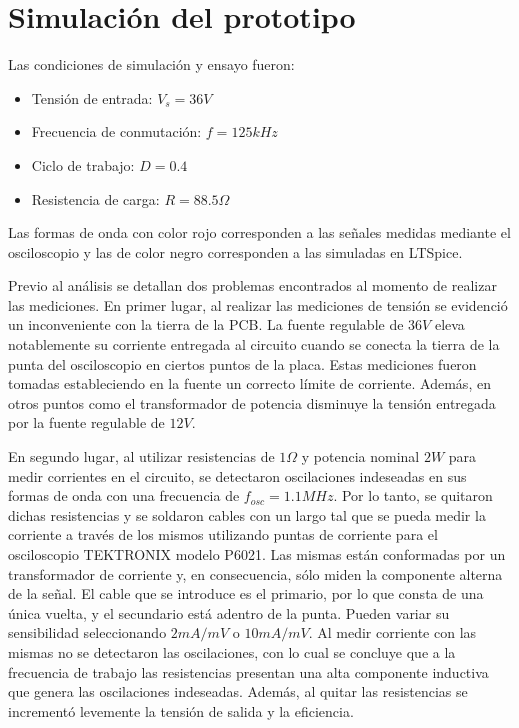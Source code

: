 \section{Simulación del prototipo}

Las condiciones de simulación y ensayo fueron:

\begin{itemize}
    \item Tensión de entrada: $V_s=36V$
    \item Frecuencia de conmutación: $f=125kHz$
    \item Ciclo de trabajo: $D=0.4$
    \item Resistencia de carga: $R=88.5\Omega$
\end{itemize}

Las formas de onda con color rojo corresponden a las señales medidas mediante el osciloscopio y las de color negro corresponden a las simuladas en LTSpice. 

Previo al análisis se detallan dos problemas encontrados al momento de realizar las mediciones.
En primer lugar, al realizar las mediciones de tensión se evidenció un inconveniente con la tierra de la PCB. 
La fuente regulable de $36V$ eleva notablemente su corriente entregada al circuito 
cuando se conecta la tierra de la punta del osciloscopio en ciertos puntos de la placa. 
Estas mediciones fueron tomadas estableciendo en la fuente un correcto límite de corriente. 
Además, en otros puntos como el transformador de potencia disminuye la tensión entregada por la fuente regulable de $12V$.

En segundo lugar, al utilizar resistencias de $1\Omega$ y potencia nominal $2W$ para medir corrientes en el circuito, 
se detectaron oscilaciones indeseadas en sus formas de onda con una frecuencia de $f_{osc}=1.1MHz$. 
Por lo tanto, se quitaron dichas resistencias y se soldaron cables con un largo tal que se pueda medir 
la corriente a través de los mismos utilizando puntas de corriente para el osciloscopio TEKTRONIX modelo P6021. 
Las mismas están conformadas por un transformador de corriente y, en consecuencia, sólo miden la componente alterna de la señal.
El cable que se introduce es el primario, por lo que consta de una única vuelta, y el secundario está adentro de la punta. 
Pueden variar su sensibilidad seleccionando $2mA/mV$ o $10mA/mV$.
Al medir corriente con las mismas no se detectaron las oscilaciones,
con lo cual se concluye que a la frecuencia de trabajo las resistencias presentan una alta componente inductiva que genera las oscilaciones indeseadas. 
Además, al quitar las resistencias se incrementó levemente la tensión de salida y la eficiencia. 

